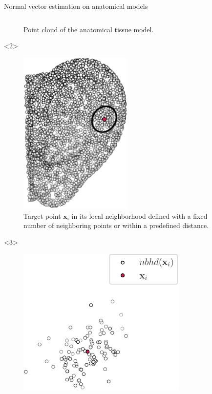 \documentclass[xcolor=dvipsnames,10pt]{beamer}
\begin{document}
\begin{frame}{Normal vector estimation on anatomical models}
\begin{columns}[c]
\begin{column}{0.5\textwidth}
\begin{onlyenv}
\begin{center}
\begin{figure}
                    \caption{Point cloud of the anatomical tissue model.}
                \end{figure}
                \end{center}
            \end{onlyenv}
            \begin{onlyenv}<2>
                \begin{center}
                \begin{figure}
                    \includegraphics[width=0.5\textwidth]{figures/ear_pcd_xi.pdf}
                    \caption{Target point $\boldsymbol{x}_i$ in its local neighborhood defined with a fixed number of neighboring points or within a predefined distance.}
                \end{figure}
                \end{center}
            \end{onlyenv}
            \begin{onlyenv}<3>
                \begin{center}
                \begin{figure}
                    \includegraphics[width=0.75\textwidth]{figures/orthogonal_set_1.pdf}

\end{figure}
\end{center}
\end{onlyenv}
\end{column}
\end{columns}
\end{frame}
\end{document}
